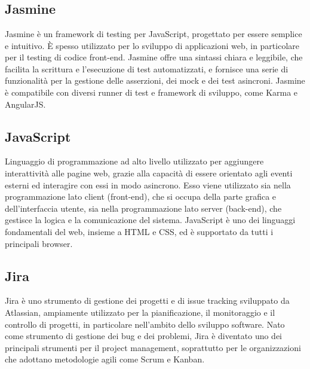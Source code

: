 
\section{}

\hypertarget{sec:jasmine}{}
\subsection*{Jasmine}
Jasmine è un framework di testing per JavaScript, progettato per essere semplice e intuitivo. È spesso utilizzato per lo sviluppo di
applicazioni web, in particolare per il testing di codice front-end. Jasmine offre una sintassi chiara e leggibile, che facilita
la scrittura e l'esecuzione di test automatizzati, e fornisce una serie di funzionalità per la gestione delle asserzioni, dei mock
e dei test asincroni. Jasmine è compatibile con diversi runner di test e framework di sviluppo, come Karma e AngularJS.

\hypertarget{sec:javascript}{}
\subsection*{JavaScript}
Linguaggio di programmazione ad alto livello utilizzato per aggiungere interattività alle pagine web, grazie alla capacità di essere
orientato agli eventi esterni ed interagire con essi in modo asincrono. Esso viene utilizzato sia nella programmazione lato client
(front-end), che si occupa della parte grafica e dell’interfaccia utente, sia nella programmazione lato server (back-end), che
gestisce la logica e la comunicazione del sistema. JavaScript è uno dei linguaggi fondamentali del web, insieme a HTML e CSS, ed
è supportato da tutti i principali browser.

\subsection*{Jira}
Jira è uno strumento di gestione dei progetti e di issue tracking sviluppato da Atlassian, ampiamente utilizzato per la pianificazione, il monitoraggio e 
il controllo di progetti, in particolare nell'ambito dello sviluppo software. Nato come strumento di gestione dei bug e dei problemi, Jira è diventato uno 
dei principali strumenti per il project management, soprattutto per le organizzazioni che adottano metodologie agili come Scrum e Kanban.

\newpage


